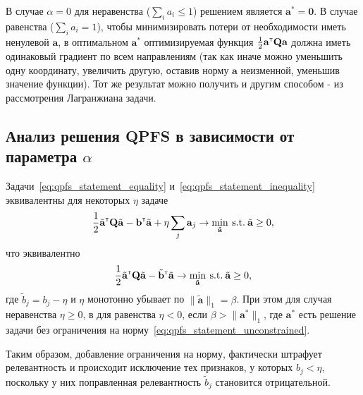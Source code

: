 \documentclass[12pt, a4paper]{article}
\newcommand{\T}{{\text{\tiny\sffamily\upshape\mdseries T}}}
\newcommand{\qmatr}{\mathbf{Q}}
\newcommand{\bvec}{\mathbf{b}}
\newcommand{\avec}{\mathbf{a}}
\newcommand{\nillvec}{\boldsymbol{0}}
\begin{document}
В случае $\alpha=0$ для неравенства ($\sum_i a_i \leq 1$) решением является $\avec^* = \nillvec$. В случае равенства ($\sum_i a_i = 1$), чтобы минимизировать потери от необходимости иметь ненулевой $\avec$, в оптимальном $\avec^*$ оптимизируемая функция $\frac{1}{2} \avec^{\T} \qmatr \avec$ должна иметь одинаковый градиент по всем направлениям (так как иначе можно уменьшить одну координату, увеличить другую, оставив норму $\avec$ неизменной, уменьшив значение функции). Тот же результат можно получить и другим способом - из рассмотрения Лагранжиана задачи.

\subsection*{Анализ решения QPFS в зависимости от параметра $\alpha$}
Задачи~\eqref{eq:qpfs_statement_equality} и~\eqref{eq:qpfs_statement_inequality} эквивалентны для некоторых $\eta$ задаче
$$
\frac{1}{2} \tilde{\avec}^{\T} \qmatr \tilde{\avec} - \bvec^{\T} \tilde{\avec} + \eta \sum_j \avec_j \to \min_{\tilde{\avec}}\:\text{s.t.}\: \tilde{\avec} \geq 0,
$$
что эквивалентно
$$
\frac{1}{2} \tilde{\avec}^{\T} \qmatr \tilde{\avec} - \tilde{\bvec}^{\T} \tilde{\avec} \to \min_{\tilde{\avec}}\:\text{s.t.}\: \tilde{\avec} \geq 0,
$$
где $\tilde{b}_j = b_j - \eta$ и $\eta$ монотонно убывает по $\|\tilde{\avec}\|_1 = \beta$. При этом для случая неравенства $\eta \geq 0$, в для равенства $\eta < 0$, если $\beta > \|\avec^*\|_1$, где $\avec^*$ есть решение задачи без ограничения на норму~\eqref{eq:qpfs_statement_unconstrained}.

Таким образом, добавление ограничения на норму, фактически штрафует релевантность и происходит исключение тех признаков, у которых $b_j < \eta$, поскольку у них поправленная релевантность $\tilde{b}_j$ становится отрицательной.
\end{document}
